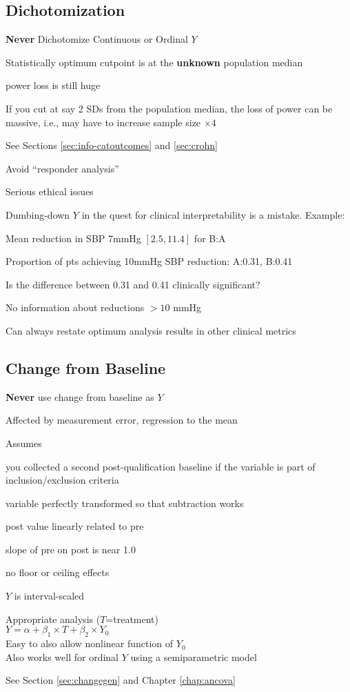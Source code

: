 \subsection{Dichotomization}
\textbf{Never} Dichotomize Continuous or Ordinal $Y$
  \bi
  \item Statistically optimum cutpoint is at the \textbf{unknown}
    population median  
    \bi
    \item power loss is still huge
    \ei
  \item If you cut at say 2 SDs from the population median, the loss
    of power can be massive, i.e., may have to increase sample size
    $\times 4$
  \item See Sections \ref{sec:info-catoutcomes} and \ref{sec:crohn}
  \item Avoid ``responder analysis''
  \item Serious ethical issues
  \item Dumbing-down $Y$ in the quest for clinical interpretability is
    a mistake.  Example:
    \bi
    \item Mean reduction in SBP 7mmHg $[2.5, 11.4]$ for B:A
    \item Proportion of pts achieving 10mmHg SBP reduction: A:0.31, B:0.41
      \bi
      \item Is the difference between 0.31 and 0.41 clinically significant?
      \item No information about reductions $> 10$ mmHg
      \ei
    \ei
  \item Can always restate optimum analysis results in other clinical metrics
  \ei
  
\subsection{Change from Baseline}
\textbf{Never} use change from baseline as $Y$
  \bi
  \item Affected by measurement error, regression to the mean
  \item Assumes
    \bi
    \item you collected a second post-qualification baseline if the
      variable is part of inclusion/exclusion criteria
    \item variable perfectly transformed so that subtraction works
    \item post value linearly related to pre
    \item slope of pre on post is near 1.0
    \item no floor or ceiling effects
    \item $Y$ is interval-scaled
    \ei
  \item Appropriate analysis ($T$=treatment) \\
  $Y = \alpha + \beta_{1}\times T + \beta_{2} \times Y_{0}$ \\
  Easy to also allow nonlinear function of $Y_{0}$\\
  Also works well for ordinal $Y$ using a semiparametric model
  \item See Section \ref{sec:changegen} and Chapter \ref{chap:ancova}
  \ei

